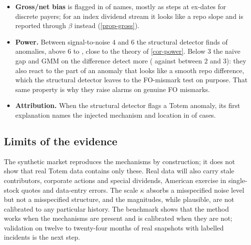 \begin{itemize}
the uncertainty of the consensus itself.
\item \textbf{Gross/net bias} is flagged in \vGrossStruct{} of names, mostly as steps at ex-dates for discrete payers;
for an index dividend stream it looks like a repo slope and is reported through $\beta$ instead
(\cref{prop-gross}).
\item \textbf{Power.} Between signal-to-noise $4$ and $6$ the structural detector finds \vPowStructE{} of anomalies,
above $6$ \vPowStructF{} to \vPowStructH, close to the theory of \cref{cor-power}. Below $3$ the naive gap and GMM on the
difference detect more (\vPowGmmDiffC{} against \vPowStructC{} between $2$ and $3$): they also react to the part of an
anomaly that looks like a smooth repo difference, which the structural detector leaves to the FO-mismark test on
purpose. That same property is why they raise alarms on genuine FO mismarks.
\item \textbf{Attribution.} When the structural detector flags a Totem anomaly, its first explanation names the
injected mechanism and location in \vAttr{} of cases.
\end{itemize}

\subsection{Limits of the evidence}
\begin{caveat}
The synthetic market reproduces the mechanisms by construction; it does not show that real Totem data contains only
these. Real data will also carry stale contributors, corporate actions and special dividends, American exercise in
single-stock quotes and data-entry errors. The scale $\kappa$ absorbs a misspecified noise level but not a misspecified
structure, and the magnitudes, while plausible, are not calibrated to any particular history. The benchmark shows that
the method works when the mechanisms are present and is calibrated when they are not; validation on twelve to
twenty-four months of real snapshots with labelled incidents is the next step.
\end{caveat}
